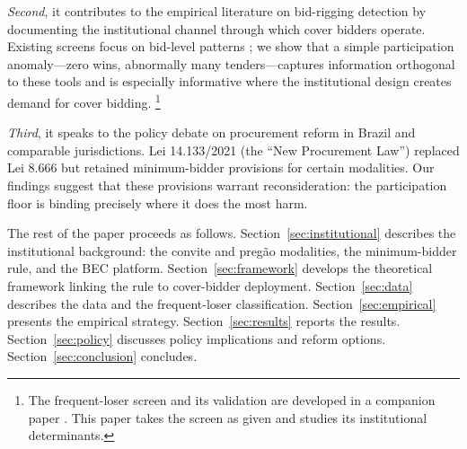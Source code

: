 \emph{Second}, it contributes to the empirical literature on
bid-rigging detection by documenting the institutional channel
through which cover bidders operate. Existing screens focus on
bid-level patterns
\citep{bajari2003deciding, imhof2019detecting, chassang2022robust};
we show that a simple participation anomaly---zero wins, abnormally
many tenders---captures information orthogonal to these tools and
is especially informative where the institutional design creates
demand for cover bidding.%
\footnote{The frequent-loser screen and its validation are
developed in a companion paper \citep[Paper~1]{genicolomartins2026screening}.
This paper takes the screen as given and studies its institutional
determinants.}

\emph{Third}, it speaks to the policy debate on procurement reform
in Brazil and comparable jurisdictions. Lei 14.133/2021 (the
``New Procurement Law'') replaced Lei 8.666 but retained
minimum-bidder provisions for certain modalities. Our findings
suggest that these provisions warrant reconsideration: the
participation floor is binding precisely where it does the most
harm.

The rest of the paper proceeds as follows. Section~\ref{sec:institutional}
describes the institutional background: the convite and preg\~ao
modalities, the minimum-bidder rule, and the BEC platform.
Section~\ref{sec:framework} develops the theoretical framework
linking the rule to cover-bidder deployment.
Section~\ref{sec:data} describes the data and the frequent-loser
classification. Section~\ref{sec:empirical} presents the empirical
strategy. Section~\ref{sec:results} reports the results.
Section~\ref{sec:policy} discusses policy implications and reform
options. Section~\ref{sec:conclusion} concludes.
